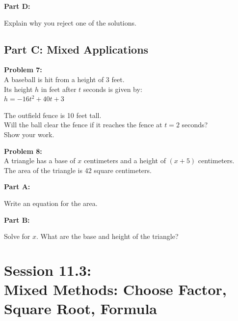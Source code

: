 \documentclass[12pt]{article}
\begin{document}
			\vspace{4cm}

			\textbf{Part D:}
            
            Explain why you reject one of the solutions.

			\newpage

		\subsection*{Part C: Mixed Applications}

			\textbf{Problem 7:}\\

			A baseball is hit from a height of 3 feet.\\

			Its height $h$ in feet after $t$ seconds is given by:\\

			$h = -16t^2 + 40t + 3$

			\vspace{0.5cm}

			The outfield fence is 10 feet tall.\\

			Will the ball clear the fence if it reaches the fence at $t = 2$ seconds?\\

			Show your work.

			\newpage

			\textbf{Problem 8:}\\

			A triangle has a base of $x$ centimeters and a height of $(x + 5)$ centimeters.\\

			The area of the triangle is 42 square centimeters.

			\vspace{0.5cm}

			\textbf{Part A:}
            
            Write an equation for the area.

			\vspace{5cm}

			\textbf{Part B:}
            
            Solve for $x$. What are the base and height of the triangle?

			\newpage

	\section*{Session 11.3: \\ Mixed Methods: Choose Factor, Square Root, Formula}
\end{document}
